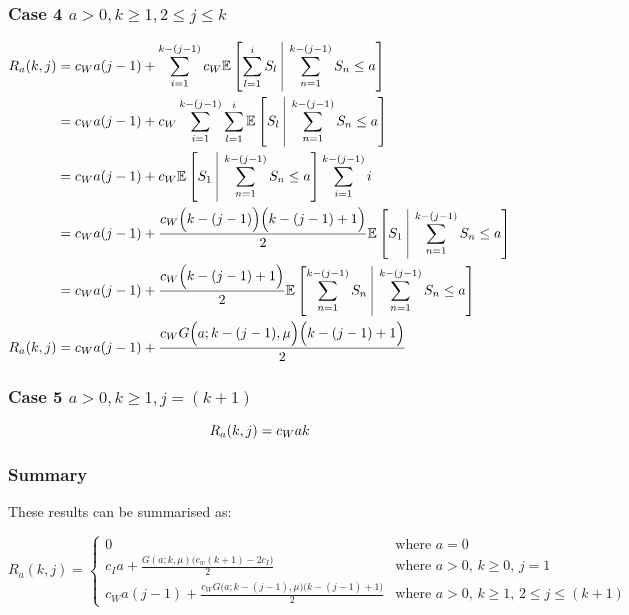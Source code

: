 \documentclass{article}
\begin{document}
\subsubsection{Case 4 $a > 0, k \geq 1, 2 \leq j \leq k$}

\begin{align*}
	R_{a} (k, j) & = c_{W} a (j - 1) + \sum_{i = 1}^{k - (j - 1)} c_{W} \mathbb{E} \left[ \sum_{l = 1}^{i} S_{l} \ \vline \ \sum_{n = 1}^{k - (j - 1)} S_{n} \leq a \right] \\
	& = c_{W} a (j - 1) + c_{W} \sum_{i = 1}^{k - (j - 1)} \sum_{l = 1}^{i} \mathbb{E} \left[ S_{l} \ \vline \ \sum_{n = 1}^{k - (j - 1)} S_{n} \leq a \right] \\
	& = c_{W} a (j - 1) + c_{W} \mathbb{E} \left[ S_{1} \ \vline \ \sum_{n = 1}^{k - (j - 1)} S_{n} \leq a \right] \sum_{i = 1}^{k - (j - 1)} i \\
	& = c_{W} a (j - 1) + \frac{c_{W} \Big( k - (j - 1) \Big) \Big( k - (j - 1) + 1 \Big)}{2} \mathbb{E} \left[ S_{1} \ \vline \ \sum_{n = 1}^{k - (j - 1)} S_{n} \leq a \right] \\
	& = c_{W} a (j - 1) + \frac{c_{W} \Big( k - (j - 1) + 1 \Big)}{2} \mathbb{E} \left[ \sum_{n = 1}^{k - (j - 1)} S_{n} \ \vline \ \sum_{n = 1}^{k - (j - 1)} S_{n} \leq a \right] \\
	R_{a} (k, j) & = c_{W} a (j - 1) + \frac{c_{W} G \Big( a; k - (j - 1), \mu \Big) \Big( k - (j - 1) + 1 \Big)}{2} \\
\end{align*}

\subsubsection{Case 5 $a > 0, k \geq 1, j = (k + 1)$}

\begin{equation*}
	R_{a} (k, j) = c_{W} a k \\
\end{equation*}

\newpage

\subsubsection{Summary}

These results can be summarised as:

\begin{equation}
	R_{a} (k, j) = \begin{cases} 0 & \text{where $a = 0$} \\
						c_{I} a + \frac{G (a; k, \mu) \big( c_{w} (k + 1) - 2 c_{I} \big)}{2} & \text{where $a > 0$, $k \geq 0$, $j = 1$} \\
						c_{W} a (j - 1) + \frac{c_{W} G \big( a; k - (j - 1), \mu \big) \big( k - (j - 1) + 1 \big)}{2} & \text{where $a > 0$, $k \geq 1$, $2 \leq j \leq (k + 1)$} \end{cases}
\end{equation}
\end{document}

